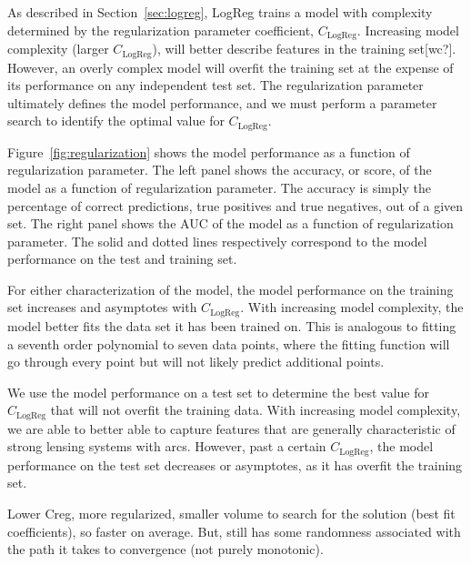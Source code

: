 \documentclass{emulateapj}
\begin{document}
As described in Section~\ref{sec:logreg}, LogReg trains a model with
complexity determined by the regularization parameter coefficient,
$C_\text{LogReg}$.  Increasing model complexity (larger
$C_\text{LogReg}$), will better describe features in the training
set[wc?].  However, an overly complex model will overfit the training
set at the expense of its performance on any independent test set.
The regularization parameter ultimately defines the model performance,
and we must perform a parameter search to identify the optimal value
for $C_\text{LogReg}$.

Figure~\ref{fig:regularization} shows the model performance as a
function of regularization parameter.  The left panel shows the
accuracy, or score, of the model as a function of regularization
parameter.  The accuracy is simply the percentage of correct
predictions, true positives and true negatives, out of a given set.
The right panel shows the AUC of the model as a function of
regularization parameter.  The solid and dotted lines respectively
correspond to the model performance on the test and training set.

For either characterization of the model, the model performance on the
training set increases and asymptotes with $C_\text{LogReg}$.  With
increasing model complexity, the model better fits the data set it has
been trained on.  This is analogous to fitting a seventh order
polynomial to seven data points, where the fitting function will go
through every point but will not likely predict additional points.

We use the model performance on a test set to determine the best value
for $C_\text{LogReg}$ that will not overfit the training data.  With
increasing model complexity, we are able to better able to capture
features that are generally characteristic of strong lensing systems
with arcs.  However, past a certain $C_\text{LogReg}$, the model
performance on the test set decreases or asymptotes, as it has overfit
the training set.

Lower Creg, more regularized, smaller volume to search for the
solution (best fit coefficients), so faster on average.  But, still
has some randomness associated with the path it takes to convergence
(not purely monotonic).
\end{document}
